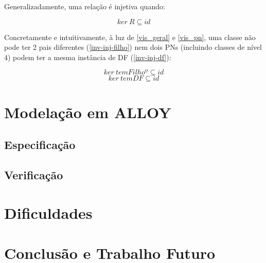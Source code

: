 \documentclass[tikz,runningheads,a4paper]{llncs}
\begin{document}
Generalizadamente, uma relação é injetiva quando:

\begin{equation}
\label{injetivity}
    ker\ R \subseteq id
\end{equation}

Concretamente e intuitivamente, à luz de \ref{vis_geral} e \ref{vis_pn}, uma classe não pode ter 2 pais diferentes (\ref{inv-inj-filho}) nem dois PNs (incluindo classes de nível 4) podem ter a mesma instância de DF (\ref{inv-inj-df}):

\begin{equation}
    \label{inv-inj-filho}
    ker\ temFilhoº \subseteq id
\end{equation}
\begin{equation}
    \label{inv-inj-df}
    ker\ temDF \subseteq id
\end{equation}


\section{Modelação em ALLOY} \label{SecAlloy}

\subsection{Especificação}


\subsection{Verificação}


\section{Dificuldades}



\section{Conclusão e Trabalho Futuro} \label{SecConclusion}

%
%
%
% 
% 
%

{}
\end{document}
